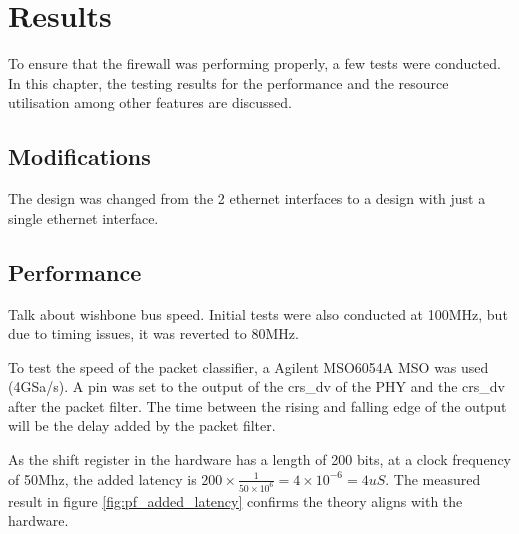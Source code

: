 
\chapter[Results]{Results}
\label{Chap:label}	%
\pagestyle{headings}


To ensure that the firewall was performing properly, a few tests were conducted. In this chapter, the testing results for the performance and the resource utilisation among other features are discussed. 

\section{Modifications}
The design was changed from the 2 ethernet interfaces to a design with just a single ethernet interface. 

\section{Performance}

Talk about wishbone bus speed. 
Initial tests were also conducted at 100MHz, but due to timing issues, it was reverted to 80MHz.


To test the speed of the packet classifier, a Agilent MSO6054A MSO was used (4GSa/s). A pin was set to the output of the crs\_dv of the PHY and the crs\_dv after the packet filter. The time between the rising and falling edge of the output will be the delay added by the packet filter. 


As the shift register in the hardware has a length of 200 bits, at a clock frequency of 50Mhz, the added latency is $200 \times \frac{1}{50\times 10^6} = 4 \times 10^{-6} = 4uS$. The measured result in figure \ref{fig:pf_added_latency} confirms the theory aligns with the hardware.


